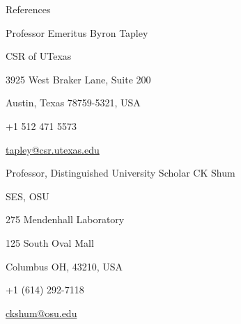 
\begin{cvtext}{References}

\begin{ittj}
  \item Professor Emeritus Byron Tapley 
  \item \acl{CSR} of \acl{UTexas}
  \item 3925 West Braker Lane, Suite 200
  \item Austin, Texas 78759-5321, \ac{USA}
  \item +1 512 471 5573
  \item \href{mailto:tapley@csr.utexas.edu}{tapley@csr.utexas.edu}
\end{ittj}

\begin{ittj}
  \item Professor, Distinguished University Scholar CK Shum
  \item \acl{SES}, \acl{OSU}
  \item 275 Mendenhall Laboratory
  \item 125 South Oval Mall
  \item Columbus OH, 43210, \acs{USA}
  \item +1 (614) 292-7118
  \item \href{mailto:ckshum@osu.edu}{ckshum@osu.edu}
\end{ittj}




\end{cvtext}
